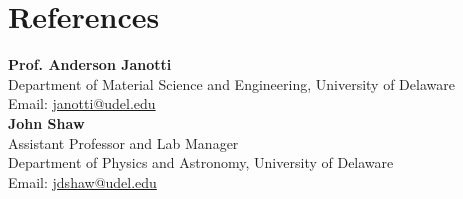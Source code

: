 \documentclass[letter,11pt]{article}
\begin{document}
\section{References}
\textbf{Prof. Anderson Janotti} \\
Department of Material Science and Engineering, University of Delaware \\
Email: \href{mailto:janotti@udel.edu}{janotti@udel.edu} \\

\noindent\textbf{John Shaw} \\
Assistant Professor and Lab Manager \\
Department of Physics and Astronomy, University of Delaware \\
Email: \href{mailto:jdshaw@udel.edu}{jdshaw@udel.edu}
\end{document}
